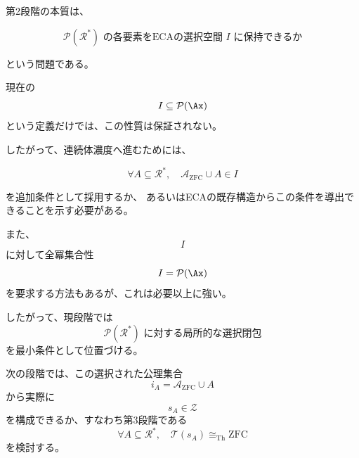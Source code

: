 \documentclass[11pt,a4paper]{article}
\begin{document}
第2段階の本質は、

\[
\boxed{
\mathcal P(\mathcal R^*)
\text{ の各要素をECAの選択空間 }I\text{ に保持できるか}
}
\]

という問題である。

現在の
\[
I\subseteq\mathcal P(\Ax)
\]
という定義だけでは、この性質は保証されない。

したがって、連続体濃度へ進むためには、

\[
\boxed{
\forall A\subseteq\mathcal R^*,
\quad
\mathcal A_{\mathrm{ZFC}}\cup A\in I
}
\]

を追加条件として採用するか、
あるいはECAの既存構造からこの条件を導出できることを示す必要がある。

また、
\[
I
\]
に対して全冪集合性
\[
I=\mathcal P(\Ax)
\]
を要求する方法もあるが、これは必要以上に強い。

したがって、現段階では
\[
\mathcal P(\mathcal R^*)\text{ に対する局所的な選択閉包}
\]
を最小条件として位置づける。

次の段階では、この選択された公理集合
\[
i_A=\mathcal A_{\mathrm{ZFC}}\cup A
\]
から実際に
\[
s_A\in\mathcal Z
\]
を構成できるか、すなわち第3段階である
\[
\boxed{
\forall A\subseteq\mathcal R^*,
\quad
\mathcal T(s_A)\cong_{\mathrm{Th}}\mathrm{ZFC}
}
\]
を検討する。
\end{document}
